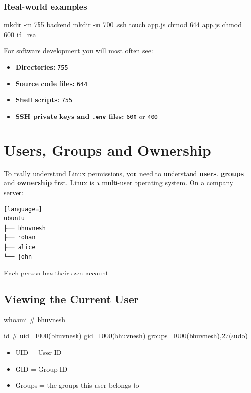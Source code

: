 \documentclass[11pt,a4paper]{article}
\begin{document}
\subsubsection*{Real-world examples}

\begin{sh}
mkdir -m 755 backend
mkdir -m 700 .ssh
touch app.js
chmod 644 app.js
chmod 600 id_rsa
\end{sh}

For software development you will most often see:

\begin{itemize}\itemsep2pt
  \item \textbf{Directories:} \lstinline|755|
  \item \textbf{Source code files:} \lstinline|644|
  \item \textbf{Shell scripts:} \lstinline|755|
  \item \textbf{SSH private keys and \lstinline|.env| files:} \lstinline|600| or \lstinline|400|
\end{itemize}

\newpage
\section{Users, Groups and Ownership}

To really understand Linux permissions, you need to understand \textbf{users},
\textbf{groups} and \textbf{ownership} first. Linux is a multi-user operating system. On a
company server:

\begin{lstlisting}[language=]
ubuntu
├── bhuvnesh
├── rohan
├── alice
└── john
\end{lstlisting}

Each person has their own account.

\subsection{Viewing the Current User}

\begin{sh}
whoami
# bhuvnesh

id
# uid=1000(bhuvnesh) gid=1000(bhuvnesh) groups=1000(bhuvnesh),27(sudo)
\end{sh}

\begin{itemize}\itemsep2pt
  \item UID = User ID
  \item GID = Group ID
  \item Groups = the groups this user belongs to
\end{itemize}
\end{document}
